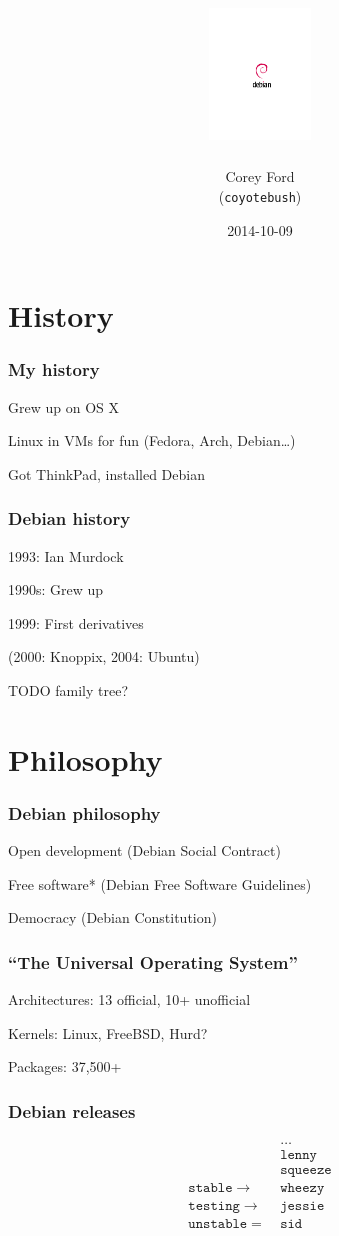 \documentclass[14pt]{beamer}
\title[Debian]{\includegraphics[viewport=274 335 360 440,height=3.5cm]{openlogo}}
\author[Corey Ford]{Corey Ford\\(\texttt{coyotebush})\vspace{-2em}}
\institute[CPLUG]{CPLUG\vspace{-2em}}
\date{2014-10-09}
\begin{document}
\frame[plain]{\titlepage}

\section{History}

\begin{frame}
  \frametitle{My history}

  Grew up on OS X

  Linux in VMs for fun (Fedora, Arch, Debian\ldots)

  Got ThinkPad, installed Debian

\end{frame}

\begin{frame}
  \frametitle{Debian history}

  1993: Ian Murdock

  1990s: Grew up

  1999: First derivatives

  (2000: Knoppix, 2004: Ubuntu)

  TODO family tree?

\end{frame}

\section{Philosophy}

\begin{frame}
  \frametitle{Debian philosophy}

  Open development
  (Debian Social Contract)

  Free software*
  (Debian Free Software Guidelines)

  Democracy
  (Debian Constitution)

\end{frame}

\begin{frame}
  \frametitle{``The Universal Operating System''}

  Architectures: 13 official, 10+ unofficial

  Kernels: Linux, FreeBSD, Hurd?

  Packages: 37,500+

\end{frame}

\begin{frame}
  \frametitle{Debian releases}

  \begin{align*}
    &\ldots\\
    &\mathtt{lenny}\\
    &\mathtt{squeeze}\\
    \mathtt{stable} \to\ &\mathtt{wheezy}\\
    \mathtt{testing} \to\ &\mathtt{jessie}\\
    \mathtt{unstable} =\ &\mathtt{sid}
  \end{align*}
\end{frame}
\end{document}
